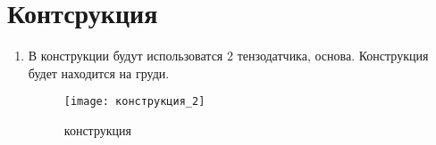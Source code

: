 \section{Контсрукция}
\begin{enumerate}

\item В конструкции будут использоватся 2 тензодатчика, основа. Конструкция будет находится на груди.

	\begin{figure}[h]
		\centering
		\texttt{[image: конструкция\_2]}
		\caption{конструкция}
	\end{figure}

\end{enumerate} 
